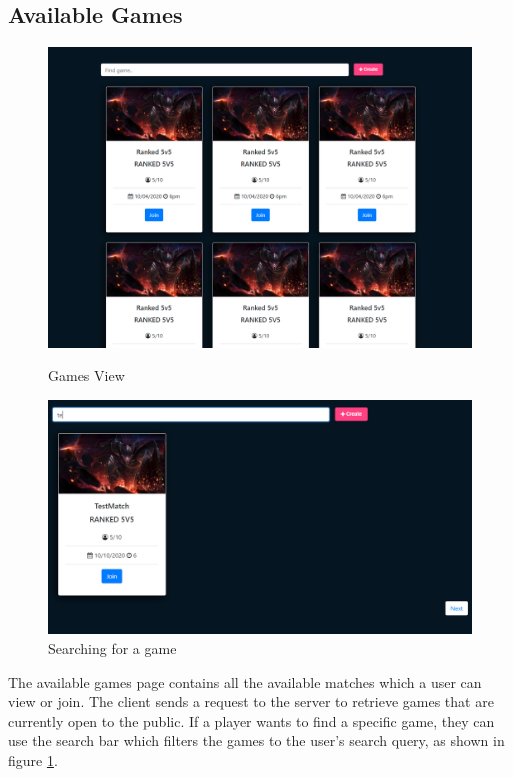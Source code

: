 \subsection{Available Games}


\begin{figure}[H]	
	\centering
	\includegraphics[width=\textwidth,height=\textheight,keepaspectratio]{img/ViewGames.png}
	\caption{Games View}
	\label{tikz:viewgames}
	\centering
	\includegraphics[width=\textwidth,height=\textheight,keepaspectratio]{img/SearchGames.png}
	\caption{Searching for a game}
	\label{tikz:searchgame}
\end{figure}
The available games page contains all the available matches which a user can view or join. The client sends a request to the server to retrieve games that are currently open to the public. If a player wants to find a specific game, they can use the search bar which filters the games to the user's search query, as shown in figure \ref{tikz:searchgame}.


